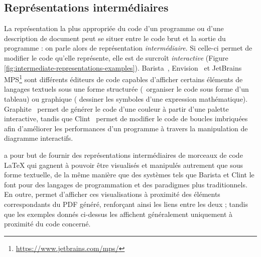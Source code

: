 \subsection{Représentations intermédiaires}

La représentation la plus appropriée du code d'un programme ou d'une description de document peut se situer entre le code brut et la sortie du programme : on parle alors de représentation \emph{intermédiaire}.
Si celle-ci permet de modifier le code qu'elle représente, elle est de surcroît \emph{interactive} ({Figure \ref{fig:intermediate-representations-examples}}).
Barista~\cite{ko2006barista}, Envision~\cite{asenov2014envision} et JetBrains MPS\footnote{\url{https://www.jetbrains.com/mps/}} sont différents éditeurs de code capables d'afficher certains éléments de langages textuels sous une forme structurée (\eg{}~organiser le code sous forme d'un tableau) ou graphique (\eg{} dessiner les symboles d'une expression mathématique).
Graphite~\cite{omar2012active} permet de générer le code d'une couleur à partir d'une palette interactive, tandis que Clint~\cite{zinenko2014clint} permet de modifier le code de boucles imbriquées afin d'améliorer les performances d'un programme à travers la manipulation de diagramme interactifs.

\iLaTeX{} a pour but de fournir des représentations intermédiaires de morceaux de code \LaTeX{} qui gagnent à pouvoir être visualisés et manipulés autrement que sous forme textuelle, de la même manière que des systèmes tels que Barista et Clint le font pour des langages de programmation et des paradigmes plus traditionnels.
En outre, \iLaTeX{} permet d'afficher ces visualisations à proximité des éléments correspondants du PDF généré, renforçant ainsi les liens entre les deux ; tandis que les exemples donnés ci-dessus les affichent généralement uniquement à proximité du code concerné.


